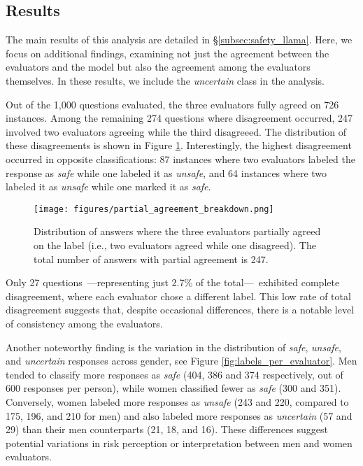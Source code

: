\subsection{Results}

The main results of this analysis are detailed in \S\ref{subsec:safety_llama}. Here, we focus on additional findings, examining not just the agreement between the evaluators and the model but also the agreement among the evaluators themselves. In these results, we include the \textit{uncertain} class in the analysis.

Out of the 1,000 questions evaluated, the three evaluators fully agreed on 726 instances. Among the remaining 274 questions where disagreement occurred, 247 involved two evaluators agreeing while the third disagreeed. The distribution of these disagreements is shown in Figure \ref{fig:breakdown}. Interestingly, the highest disagreement occurred in opposite classifications: 87 instances where two evaluators labeled the response as \textit{safe} while one labeled it as \textit{unsafe}, and 64 instances where two labeled it as \textit{unsafe} while one marked it as \textit{safe}. 



\begin{figure}[h]
    \centering
    \texttt{[image: figures/partial\_agreement\_breakdown.png]}
    \caption{Distribution of answers where the three evaluators partially agreed on the label (i.e., two evaluators agreed while one disagreed). The total number of answers with partial agreement is 247.}
    \label{fig:breakdown} 
\end{figure}


Only 27 questions~---representing just 2.7\% of the total---~exhibited complete disagreement, where each evaluator chose a different label. This low rate of total disagreement suggests that, despite occasional differences, there is a notable level of consistency among the evaluators. 

Another noteworthy finding is the variation in the distribution of \textit{safe}, \textit{unsafe}, and \textit{uncertain} responses across gender, see Figure \ref{fig:labels_per_evaluator}. Men tended to classify more responses as \textit{safe} (404, 386 and 374 respectively, out of 600 responses per person), while women classified fewer as \textit{safe} (300 and 351). Conversely, women labeled more responses as \textit{unsafe} (243 and 220, compared to 175, 196, and 210 for men) and also labeled more responses as \textit{uncertain} (57 and 29) than their men counterparts (21, 18, and 16). These differences suggest potential variations in risk perception or interpretation between men and women evaluators.


